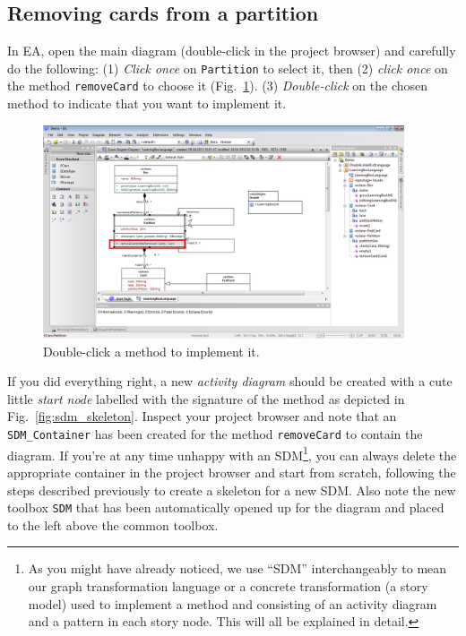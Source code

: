 \subsection{Removing cards from a partition}

In EA, open the main diagram (double-click in the project browser) and carefully do the following: (1) \emph{Click once} on \texttt{Partition} to select it, then (2) \emph{click once} on the method \texttt{removeCard} to choose it (Fig.~\ref{fig:sdm_start}). 
(3) \emph{Double-click} on the chosen method to indicate that you want to implement it.

\begin{figure}[htp]
\begin{center}
  \includegraphics[width=0.95\textwidth]{pics/sdmBilder/removeCard/sdm01RAW}
  \caption{Double-click a method to implement it.}  
  \label{fig:sdm_start}
\end{center}
\end{figure}
 
If you did everything right, a new \emph{activity diagram} should be created  with a cute little \emph{start node} labelled with the signature of the method  as depicted in Fig.~\ref{fig:sdm_skeleton}.  Inspect your project browser and note that an \texttt{SDM\_Container} has been created for the method \texttt{removeCard} to contain the diagram.  
If you're at any time unhappy with an SDM\footnote{As you might have already noticed, we use ``SDM'' interchangeably to mean our graph transformation language or a concrete transformation (a story model) used to implement a method and consisting of an activity diagram and a pattern in each story node.  
This will all be explained in detail.}, you can always delete the appropriate container in the project browser and start from scratch, following the steps described previously to create a skeleton for a new SDM.  
Also note the new  toolbox \texttt{SDM} that has been automatically opened up for the diagram and placed to the left above the common toolbox. 

